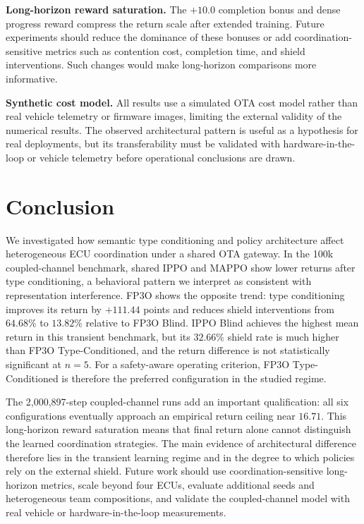 \documentclass[conference]{IEEEtran}
\begin{document}
\textbf{Long-horizon reward saturation.}
The $+10.0$ completion bonus and dense progress reward compress the return scale after
extended training. Future experiments should reduce the dominance of these bonuses or
add coordination-sensitive metrics such as contention cost, completion time, and shield
interventions. Such changes would make long-horizon comparisons more informative.

\textbf{Synthetic cost model.}
All results use a simulated OTA cost model rather than real vehicle telemetry or firmware
images, limiting the external validity of the numerical results. The observed architectural
pattern is useful as a hypothesis for real deployments, but its transferability must be
validated with hardware-in-the-loop or vehicle telemetry before operational conclusions are
drawn.


\section{Conclusion}

We investigated how semantic type conditioning and policy architecture affect
heterogeneous ECU coordination under a shared OTA gateway. In the 100k coupled-channel
benchmark, shared IPPO and MAPPO show lower returns after type conditioning, a behavioral
pattern we interpret as consistent with representation interference. FP3O shows the opposite
trend: type conditioning improves its return by $+111.44$ points and reduces shield
interventions from $64.68\%$ to $13.82\%$ relative to FP3O Blind. IPPO Blind achieves
the highest mean return in this transient benchmark, but its $32.66\%$ shield rate is much
higher than FP3O Type-Conditioned, and the return difference is not statistically
significant at $n=5$. For a safety-aware operating criterion, FP3O Type-Conditioned is
therefore the preferred configuration in the studied regime.

The 2,000,897-step coupled-channel runs add an important qualification: all six
configurations eventually approach an empirical return ceiling near $16.71$. This
long-horizon reward saturation means that final return alone cannot distinguish the learned
coordination strategies. The main evidence of architectural difference therefore lies in
the transient learning regime and in the degree to which policies rely on the external
shield. Future work should use coordination-sensitive long-horizon metrics, scale beyond
four ECUs, evaluate additional seeds and heterogeneous team compositions, and validate the
coupled-channel model with real vehicle or hardware-in-the-loop measurements.
\end{document}
